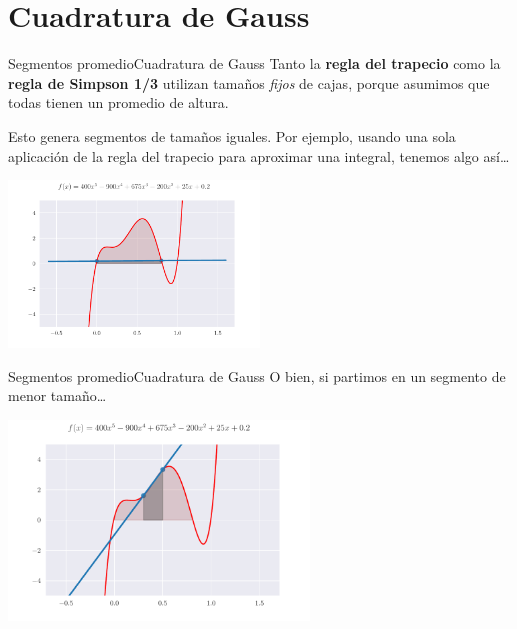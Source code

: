 \documentclass[spanish, c, dvipsnames]{beamer}
\begin{document}
\section{Cuadratura de Gauss}

\begin{frame}{Segmentos promedio}{Cuadratura de Gauss}
    Tanto la \textbf{regla del trapecio} como la \textbf{regla de Simpson 1/3} utilizan tamaños \textit{fijos} de cajas, porque asumimos que todas tienen un promedio de altura. \pause

    \bigskip

    Esto genera segmentos de tamaños iguales. Por ejemplo, usando una sola aplicación de la regla del trapecio para aproximar una integral, tenemos algo así\dots

    \begin{center}
        \includegraphics[width=0.5\textwidth]{awfulposition02.pdf}
    \end{center}

\end{frame}

\begin{frame}{Segmentos promedio}{Cuadratura de Gauss}
    O bien, si partimos en un segmento de menor tamaño\dots

    \begin{center}
        \includegraphics[width=0.6\textwidth]{awfulposition01.pdf}
    \end{center}
\end{frame}
\end{document}
